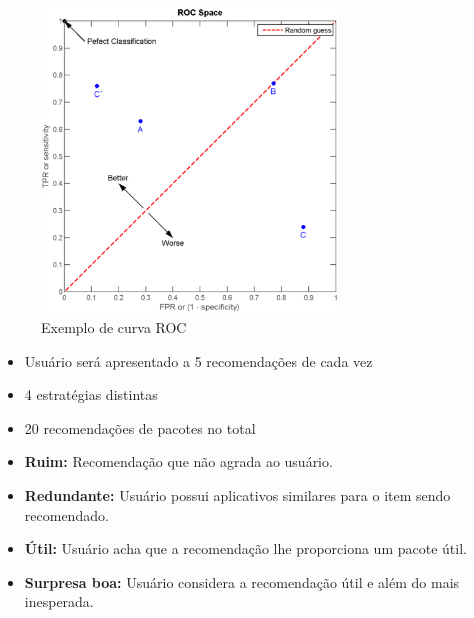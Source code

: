 \begin{frame}
\begin{figure}[h]
  \centering
  \includegraphics[width=0.7\textwidth]{figura/curva_roc.eps}
  \caption{Exemplo de curva ROC}
  \label{fig:curva_roc}
\end{figure}

\end{frame}

\begin{frame}

    \begin{itemize}
        \item Usuário será apresentado a 5 recomendações de cada vez
        \item 4 estratégias distintas
        \item 20 recomendações de pacotes no total
    \end{itemize}

\end{frame}

\begin{frame}

 \begin{itemize}
    \item \textbf{Ruim: } Recomendação que não agrada ao usuário.
    \item \textbf{Redundante: } Usuário possui aplicativos similares para o item
        sendo recomendado.
    \item \textbf{Útil: } Usuário acha que a recomendação lhe proporciona um
            pacote útil.
    \item \textbf{Surpresa boa: } Usuário considera a recomendação útil e além
        do mais inesperada.
\end{itemize}


\end{frame}

